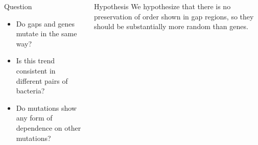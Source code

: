 \documentclass[final]{beamer}
\begin{document}
\begin{frame}{}
\begin{columns}[t]
\begin{column}{.32 \linewidth}
\begin{block}{\large Question}
\begin{itemize}
	\item Do gaps and genes mutate in the same way?
	\item Is this trend consistent in different pairs of bacteria?
	\item Do mutations show any form of dependence on other mutations?
\end{itemize} 
\end{block}



\end{column}


\begin{column}{.32 \linewidth}
 \begin{block}{\large Hypothesis}
	We hypothesize that there is no preservation of order shown in gap regions, so they should be substantially more random than genes.
	

\end{block}
\end{column}
\end{columns}
\end{frame}
\end{document}
